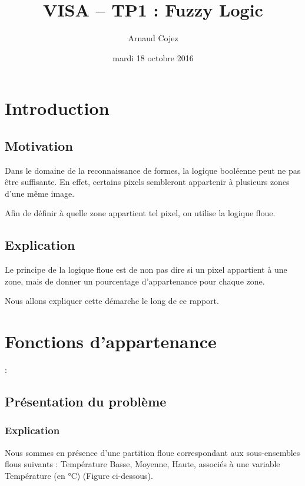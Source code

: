 \documentclass[a4paper]{article}
\begin{document}
\title{VISA -- TP1 : Fuzzy Logic}
\author{Arnaud Cojez}
\date{mardi 18 octobre 2016}

\maketitle

\newpage
\tableofcontents
\newpage

\section{Introduction}

\subsection{Motivation}
Dans le domaine de la reconnaissance de formes, la logique booléenne peut ne pas être suffisante. En effet, certains pixels sembleront appartenir à plusieurs zones d'une même image.

Afin de définir à quelle zone appartient tel pixel, on utilise la logique floue.

\subsection{Explication}
Le principe de la logique floue est de non pas dire si un pixel appartient à une zone, mais de donner un pourcentage d'appartenance pour chaque zone.

Nous allons expliquer cette démarche le long de ce rapport.

\clearpage

\section{Fonctions d'appartenance}:

\subsection{Présentation du problème}

\subsubsection{Explication}
Nous sommes en présence d'une partition floue correspondant aux sous-ensembles flous suivants : Température Basse, Moyenne, Haute, associés à une variable Température (en °C) (Figure ci-dessous).
\end{document}
